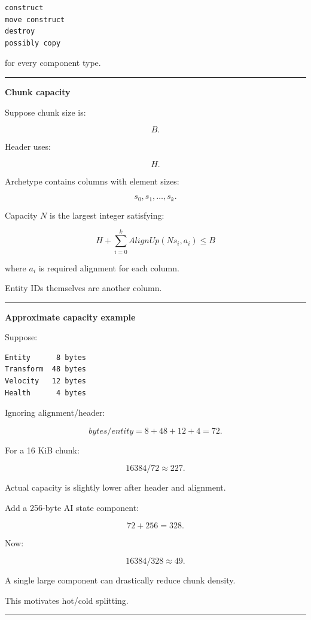 \begin{verbatim}
construct
move construct
destroy
possibly copy
\end{verbatim}

for every component type.

\begin{center}\rule{0.5\linewidth}{0.5pt}\end{center}

\textbf{Chunk capacity}

Suppose chunk size is:

\[
B.
\]

Header uses:

\[
H.
\]

Archetype contains columns with element sizes:

\[
s_0,s_1,\dots,s_k.
\]

Capacity \(N\) is the largest integer satisfying:

\[
\boxed{
H+
\sum_{i=0}^{k}
AlignUp(Ns_i,a_i)
\le B
}
\]

where \(a_i\) is required alignment for each column.

Entity IDs themselves are another column.

\begin{center}\rule{0.5\linewidth}{0.5pt}\end{center}

\textbf{Approximate capacity example}

Suppose:

\begin{verbatim}
Entity      8 bytes
Transform  48 bytes
Velocity   12 bytes
Health      4 bytes
\end{verbatim}

Ignoring alignment/header:

\[
bytes/entity
=
8+48+12+4
=
72.
\]

For a 16 KiB chunk:

\[
16384/72
\approx227.
\]

Actual capacity is slightly lower after header and alignment.

Add a 256-byte AI state component:

\[
72+256=328.
\]

Now:

\[
16384/328
\approx49.
\]

A single large component can drastically reduce chunk density.

This motivates hot/cold splitting.

\begin{center}\rule{0.5\linewidth}{0.5pt}\end{center}

